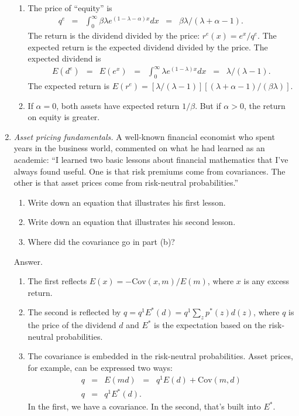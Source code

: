 \documentclass[11pt]{article}
\begin{document}
\begin{enumerate}
\begin{enumerate}
\item The price of ``equity'' is
\begin{eqnarray*}
    q^e &=& \int_{0}^\infty \beta \lambda e^{(1-\lambda -\alpha) x} dx
            \;\;=\;\; \beta \lambda /(\lambda + \alpha-1) . \phantom{sum^K}
\end{eqnarray*}
The return is the dividend divided by the price:  $r^e(x) = e^x/q^e$.
The expected return is the expected dividend divided by the price.
The expected dividend is
\begin{eqnarray*}
    E(d^e) &=& E(e^x) \;\;=\;\; \int_{0}^\infty \lambda e^{(1-\lambda) x} dx
            \;\;=\;\; \lambda/(\lambda-1) .
\end{eqnarray*}
The expected return is $ E(r^e) = [\lambda/(\lambda-1)] [(\lambda+\alpha-1)/(\beta \lambda) ]$.

\item If $\alpha = 0$, both assets have expected return $1/\beta$.
But if $\alpha > 0$, the return on equity is greater.
\end{enumerate}

\item {\it Asset pricing fundamentals.\/}
A well-known financial economist who spent years in the business world,
commented on what he had learned as an academic:
``I learned two basic lessons about financial mathematics
that I've always found useful.
One is that risk premiums come from covariances.
The other is that asset prices come from risk-neutral probabilities.''
%
\begin{enumerate}
\item Write down an equation that illustrates his first lesson.
\item Write down an equation that illustrates his second lesson.
\item Where did the covariance go in part (b)?
\end{enumerate}

Answer.
\begin{enumerate}
\item The first reflects $ E(x) = - \mbox{Cov}(x,m)/E(m) $,
where $x$ is any excess return.

\item The second is reflected by $ q = q^1 E^*(d) = q^1 \sum_z p^*(z) d(z) $,
where $q$ is the price of the dividend $d$ and $E^*$ is the expectation based on
the risk-neutral probabilities.

\item The covariance is embedded in the risk-neutral probabilities.
Asset prices, for example, can be expressed two ways:
\begin{eqnarray*}
    q &=& E (m d) \;\;=\;\; q^1 E(d) + \mbox{Cov}(m,d) \\
    q &=& q^1 E^*(d) .
\end{eqnarray*}
In the first, we have a covariance.
In the second, that's built into $E^*$.
\end{enumerate}

\end{enumerate}
\end{document}
